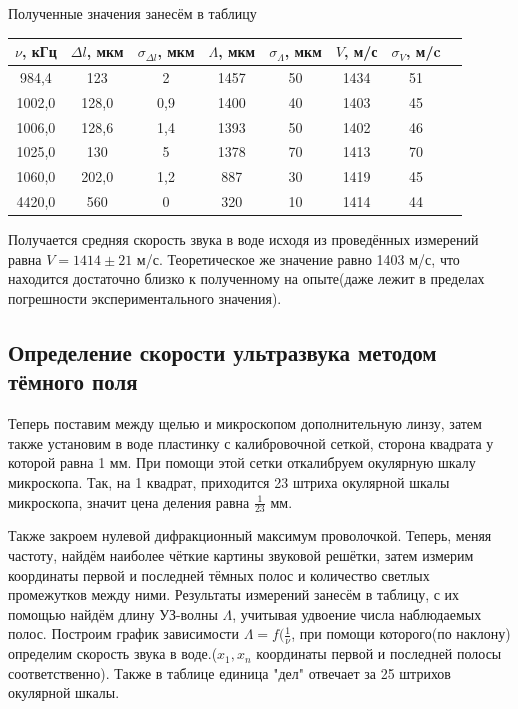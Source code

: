 \documentclass[a4paper,12pt]{article}
\begin{document}
Полученные значения занесём в таблицу
\begin{table}[H]
	\begin{tabular}{|c|c|c|c|c|c|c|c|}
	\hline
	$\nu$, кГц & $\Delta l$, мкм & $\sigma_{\Delta l}$, мкм & $\Lambda$, мкм & $\sigma_{\Lambda}$, мкм & $V$, м/с & $\sigma_V$, м/c \\ \hline
	984,4 & 123 & 2 & 1457 & 50 & 1434 & 51\\ \hline
	1002,0 & 128,0 & 0,9 & 1400 & 40 & 1403 & 45\\ \hline
	1006,0 & 128,6 & 1,4 & 1393 & 50 & 1402 & 46 \\ \hline
	1025,0 & 130 & 5 & 1378 & 70 & 1413 & 70 \\ \hline
	1060,0 & 202,0 & 1,2 & 887 & 30 & 1419 & 45 \\ \hline
	4420,0 & 560 & 0 & 320 & 10 & 1414 & 44 \\ \hline
	
	\end{tabular}
\end{table}

Получается средняя скорость звука в воде исходя из проведённых измерений равна $V = 1414 \pm 21$ м/с. Теоретическое же значение равно 1403 м/с, что находится достаточно близко к полученному на опыте(даже лежит в пределах погрешности экспериментального значения).
\subsection*{Определение скорости ультразвука методом тёмного поля}
Теперь поставим между щелью и микроскопом дополнительную линзу, затем также установим в воде пластинку с калибровочной сеткой, сторона квадрата у которой равна 1 мм. При помощи этой сетки откалибруем окулярную шкалу микроскопа. Так, на 1 квадрат, приходится 23 штриха окулярной шкалы микроскопа, значит цена деления равна $\frac{1}{23}$ мм. 

Также закроем нулевой дифракционный максимум проволочкой. Теперь, меняя частоту, найдём наиболее чёткие картины звуковой решётки, затем измерим координаты первой и последней тёмных полос и количество светлых промежутков между ними. Результаты измерений занесём в таблицу, с их помощью найдём длину УЗ-волны $\Lambda$, учитывая удвоение числа наблюдаемых полос. Построим график зависимости $\Lambda = f(\frac{1}{\nu}$, при помощи которого(по наклону) определим скорость звука в воде.($x_1, x_n$ координаты первой и последней полосы соответственно). Также в таблице единица "дел" отвечает за 25 штрихов окулярной шкалы.
\end{document}
